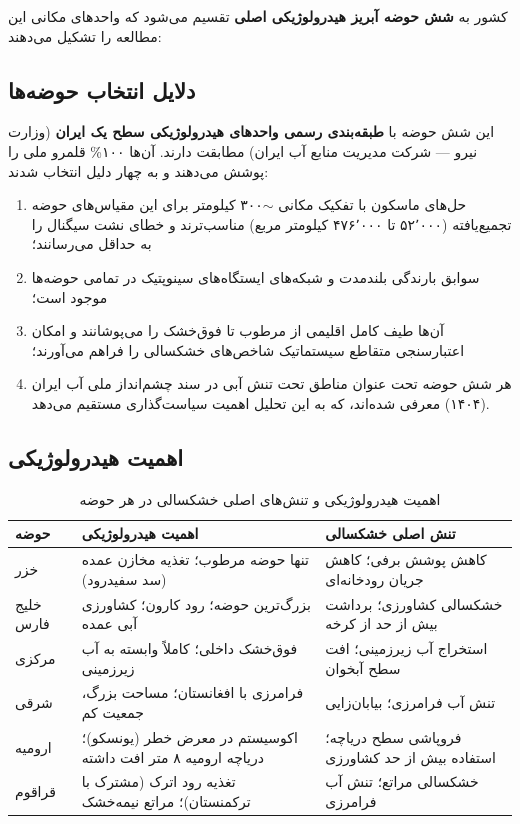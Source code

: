 \documentclass[12pt, a4paper]{article}
\begin{document}
کشور به \textbf{شش حوضه آبریز هیدرولوژیکی اصلی} تقسیم می‌شود که واحدهای مکانی این
مطالعه را تشکیل می‌دهند:


\subsection{دلایل انتخاب حوضه‌ها}
\label{sec:4-1a-2}

این شش حوضه با \textbf{طبقه‌بندی رسمی واحدهای هیدرولوژیکی سطح یک ایران} (وزارت نیرو —
شرکت مدیریت منابع آب ایران) مطابقت دارند. آن‌ها ۱۰۰\% قلمرو ملی را پوشش می‌دهند و به
چهار دلیل انتخاب شدند:
\begin{enumerate}
  \item حل‌های ماسکون  با تفکیک مکانی $\sim$۳۰۰ کیلومتر برای این مقیاس‌های حوضه
        تجمیع‌یافته (۵۲٬۰۰۰ تا ۴۷۶٬۰۰۰ کیلومتر مربع) مناسب‌ترند و خطای نشت سیگنال را
        به حداقل می‌رسانند؛
  \item سوابق بارندگی بلندمدت  و شبکه‌های ایستگاه‌های سینوپتیک در تمامی
        حوضه‌ها موجود است؛
  \item آن‌ها طیف کامل اقلیمی از مرطوب تا فوق‌خشک را می‌پوشانند و امکان اعتبارسنجی
        متقاطع سیستماتیک شاخص‌های خشکسالی را فراهم می‌آورند؛
  \item هر شش حوضه تحت عنوان مناطق تحت تنش آبی در سند چشم‌انداز ملی آب ایران (۱۴۰۴)
        معرفی شده‌اند، که به این تحلیل اهمیت سیاست‌گذاری مستقیم می‌دهد.
\end{enumerate}

\subsection{اهمیت هیدرولوژیکی}
\label{sec:4-1a-3}

\begin{table}[htbp]
  \centering
  \caption{اهمیت هیدرولوژیکی و تنش‌های اصلی خشکسالی در هر حوضه}
  \label{tab:hydro-importance}
  \small
  \begin{tabularx}{\textwidth}{lXX}\toprule
    \textbf{حوضه} & \textbf{اهمیت هیدرولوژیکی} & \textbf{تنش اصلی خشکسالی} \\
    \midrule
    خزر        & تنها حوضه مرطوب؛ تغذیه مخازن عمده (سد سفیدرود) &
                 کاهش پوشش برفی؛ کاهش جریان رودخانه‌ای \\
    خلیج فارس & بزرگ‌ترین حوضه؛ رود کارون؛ کشاورزی آبی عمده &
                 خشکسالی کشاورزی؛ برداشت بیش از حد از کرخه \\
    مرکزی     & فوق‌خشک داخلی؛ کاملاً وابسته به آب زیرزمینی &
                 استخراج آب زیرزمینی؛ افت سطح آبخوان \\
    شرقی      & فرامرزی با افغانستان؛ مساحت بزرگ، جمعیت کم &
                 تنش آب فرامرزی؛ بیابان‌زایی \\
    ارومیه    & اکوسیستم در معرض خطر (یونسکو)؛ دریاچه ارومیه ۸ متر افت داشته &
                 فروپاشی سطح دریاچه؛ استفاده بیش از حد کشاورزی \\
    قراقوم    & تغذیه رود اترک (مشترک با ترکمنستان)؛ مراتع نیمه‌خشک &
                 خشکسالی مراتع؛ تنش آب فرامرزی \\
    \bottomrule
  \end{tabularx}
\end{table}
\end{document}
